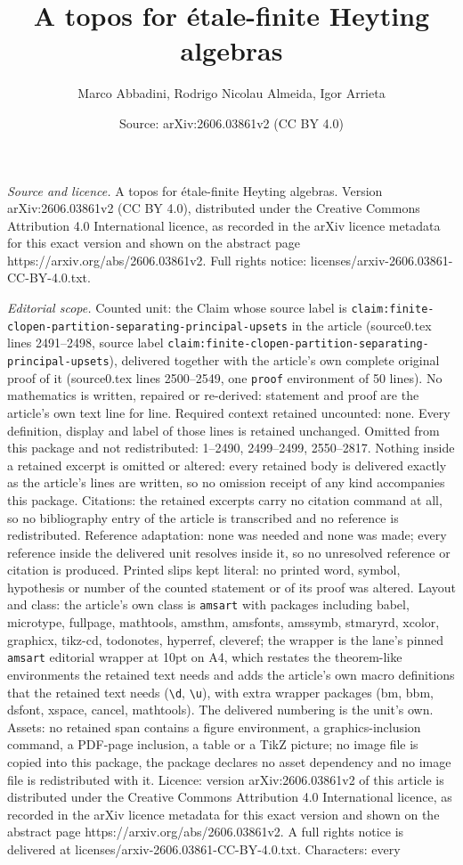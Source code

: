 \documentclass[10pt,a4paper]{amsart}
\title[A topos for \'etale-finite Heyting algebras]{A topos for \'etale-finite Heyting algebras}
\author{Marco Abbadini, Rodrigo Nicolau Almeida, Igor Arrieta}
\date{Source: arXiv:2606.03861v2 (CC BY 4.0)}
\begin{document}
\maketitle

\noindent\emph{Source and licence.} A topos for \'etale-finite Heyting algebras. Version arXiv:2606.03861v2 (CC BY 4.0), distributed under the Creative Commons Attribution 4.0 International licence, as recorded in the arXiv licence metadata for this exact version and shown on the abstract page https://arxiv.org/abs/2606.03861v2. Full rights notice: licenses/arxiv-2606.03861-CC-BY-4.0.txt.\par\smallskip

\noindent\textit{Editorial scope.} Counted unit: the Claim whose source label is \texttt{claim:finite-clopen-partition-separating-principal-upsets} in the article (source0.tex lines 2491--2498, source label \texttt{claim:finite-clopen-partition-separating-principal-upsets}), delivered together with the article's own complete original proof of it (source0.tex lines 2500--2549, one \texttt{proof} environment of 50 lines). No mathematics is written, repaired or re-derived: statement and proof are the article's own text line for line. Required context retained uncounted: none. Every definition, display and label of those lines is retained unchanged. Omitted from this package and not redistributed: 1--2490, 2499--2499, 2550--2817. Nothing inside a retained excerpt is omitted or altered: every retained body is delivered exactly as the article's lines are written, so no omission receipt of any kind accompanies this package. Citations: the retained excerpts carry no citation command at all, so no bibliography entry of the article is transcribed and no reference is redistributed. Reference adaptation: none was needed and none was made; every reference inside the delivered unit resolves inside it, so no unresolved reference or citation is produced. Printed slips kept literal: no printed word, symbol, hypothesis or number of the counted statement or of its proof was altered. Layout and class: the article's own class is \texttt{amsart} with packages including babel, microtype, fullpage, mathtools, amsthm, amsfonts, amssymb, stmaryrd, xcolor, graphicx, tikz-cd, todonotes, hyperref, cleveref; the wrapper is the lane's pinned \texttt{amsart} editorial wrapper at 10pt on A4, which restates the theorem-like environments the retained text needs and adds the article's own macro definitions that the retained text needs (\texttt{\textbackslash d}, \texttt{\textbackslash u}), with extra wrapper packages (bm, bbm, dsfont, xspace, cancel, mathtools). The delivered numbering is the unit's own. Assets: no retained span contains a figure environment, a graphics-inclusion command, a PDF-page inclusion, a table or a TikZ picture; no image file is copied into this package, the package declares no asset dependency and no image file is redistributed with it. Licence: version arXiv:2606.03861v2 of this article is distributed under the Creative Commons Attribution 4.0 International licence, as recorded in the arXiv licence metadata for this exact version and shown on the abstract page https://arxiv.org/abs/2606.03861v2. A full rights notice is delivered at licenses/arxiv-2606.03861-CC-BY-4.0.txt. Characters: every 
\end{document}
